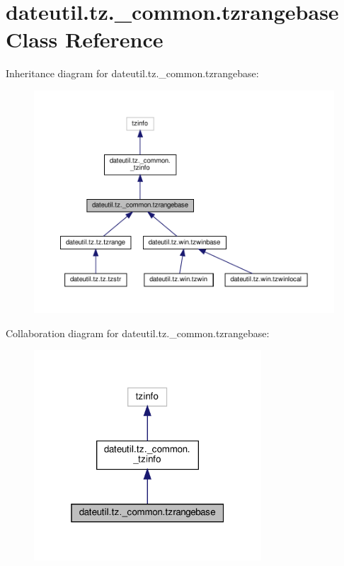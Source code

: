 \hypertarget{classdateutil_1_1tz_1_1__common_1_1tzrangebase}{}\section{dateutil.\+tz.\+\_\+common.\+tzrangebase Class Reference}
\label{classdateutil_1_1tz_1_1__common_1_1tzrangebase}


Inheritance diagram for dateutil.\+tz.\+\_\+common.\+tzrangebase\+:
\nopagebreak
\begin{figure}[H]
\begin{center}
\leavevmode
\includegraphics[width=350pt]{classdateutil_1_1tz_1_1__common_1_1tzrangebase__inherit__graph}
\end{center}
\end{figure}


Collaboration diagram for dateutil.\+tz.\+\_\+common.\+tzrangebase\+:
\nopagebreak
\begin{figure}[H]
\begin{center}
\leavevmode
\includegraphics[width=241pt]{classdateutil_1_1tz_1_1__common_1_1tzrangebase__coll__graph}
\end{center}
\end{figure}
